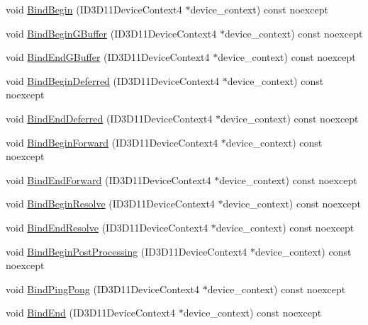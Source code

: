 \begin{DoxyCompactItemize}
\item 
void \hyperlink{classmage_1_1_rendering_output_manager_aca82046ea30351c98e652571fef0ebf3}{Bind\+Begin} (I\+D3\+D11\+Device\+Context4 $\ast$device\+\_\+context) const noexcept
\item 
void \hyperlink{classmage_1_1_rendering_output_manager_aaf66f4a405ed9e8ab54474620bc9aef9}{Bind\+Begin\+G\+Buffer} (I\+D3\+D11\+Device\+Context4 $\ast$device\+\_\+context) const noexcept
\item 
void \hyperlink{classmage_1_1_rendering_output_manager_a40e30533e1145586469121117c15b42a}{Bind\+End\+G\+Buffer} (I\+D3\+D11\+Device\+Context4 $\ast$device\+\_\+context) const noexcept
\item 
void \hyperlink{classmage_1_1_rendering_output_manager_ae9fa2b0bfe9e8d935d5dc99288acaf78}{Bind\+Begin\+Deferred} (I\+D3\+D11\+Device\+Context4 $\ast$device\+\_\+context) const noexcept
\item 
void \hyperlink{classmage_1_1_rendering_output_manager_a18bd478dd015a66f4874116f243da37a}{Bind\+End\+Deferred} (I\+D3\+D11\+Device\+Context4 $\ast$device\+\_\+context) const noexcept
\item 
void \hyperlink{classmage_1_1_rendering_output_manager_aaedc2fef9e4b69da6dcd264609225420}{Bind\+Begin\+Forward} (I\+D3\+D11\+Device\+Context4 $\ast$device\+\_\+context) const noexcept
\item 
void \hyperlink{classmage_1_1_rendering_output_manager_ac9fc0758bcd83db7ae24641d4fd38273}{Bind\+End\+Forward} (I\+D3\+D11\+Device\+Context4 $\ast$device\+\_\+context) const noexcept
\item 
void \hyperlink{classmage_1_1_rendering_output_manager_a68c24a526a6a7dba7875f66152b73b3f}{Bind\+Begin\+Resolve} (I\+D3\+D11\+Device\+Context4 $\ast$device\+\_\+context) const noexcept
\item 
void \hyperlink{classmage_1_1_rendering_output_manager_a406c918e63032968a5c82f7ae7d39606}{Bind\+End\+Resolve} (I\+D3\+D11\+Device\+Context4 $\ast$device\+\_\+context) const noexcept
\item 
void \hyperlink{classmage_1_1_rendering_output_manager_acf03c6d085d822713e52dec49ef99595}{Bind\+Begin\+Post\+Processing} (I\+D3\+D11\+Device\+Context4 $\ast$device\+\_\+context) const noexcept
\item 
void \hyperlink{classmage_1_1_rendering_output_manager_a3e35046ac247c08aab2a9631b1beef7d}{Bind\+Ping\+Pong} (I\+D3\+D11\+Device\+Context4 $\ast$device\+\_\+context) const noexcept
\item 
void \hyperlink{classmage_1_1_rendering_output_manager_a212a0ec7330f52dbe30f87bebccb0c8e}{Bind\+End} (I\+D3\+D11\+Device\+Context4 $\ast$device\+\_\+context) const noexcept
\end{DoxyCompactItemize}
